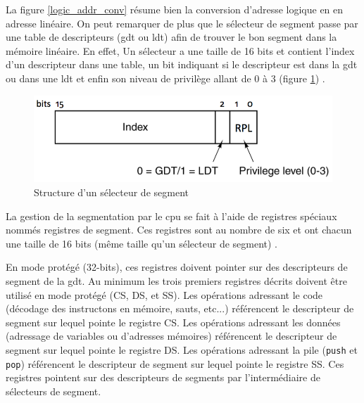 La figure \ref{logic_addr_conv} résume bien la conversion d'adresse logique en
en adresse linéaire. On peut remarquer de plus que le sélecteur de segment passe
par une table de descripteurs (\acrshort{gdt} ou \acrshort{ldt}) afin de trouver
le bon segment dans la mémoire linéaire. En effet, Un sélecteur a une taille de
16 bits et contient l'index d'un descripteur dans une table, un bit indiquant si
le descripteur est dans la \acrshort{gdt} ou dans une \acrshort{ldt} et enfin son
niveau de privilège allant de 0 à 3 (figure \ref{seg_sel}) \cite{ref42}.

\begin{figure}[!h]
  \centering
  \includegraphics[scale=0.6]{images/seg_sel.png}
  \caption{Structure d'un sélecteur de segment}
  \label{seg_sel}
\end{figure}

La gestion de la segmentation par le \acrshort{cpu} se fait à l'aide de registres
spéciaux nommés registres de segment. Ces registres sont au nombre de six et ont
chacun une taille de 16 bits (même taille qu'un sélecteur de segment) \cite{ref42,ref18}.

\begin{center}
\end{center}

En mode protégé (32-bits), ces registres doivent pointer sur des descripteurs
de segment de la \acrshort{gdt}. Au minimum les trois premiers registres décrits
doivent être utilisé en mode protégé (CS, DS, et SS). Les opérations adressant
le code (décodage des instructons en mémoire, sauts, etc...) référencent le descripteur
de segment sur lequel pointe le registre CS. Les opérations adressant les données
(adressage de variables ou d'adresses mémoires) référencent le descripteur de segment
sur lequel pointe le registre DS. Les opérations adressant la pile (\texttt{push}
et \texttt{pop}) référencent le descripteur de segment sur lequel pointe
le registre SS. Ces registres pointent sur des descripteurs de segments par l'intermédiaire
de sélecteurs de segment. \\

